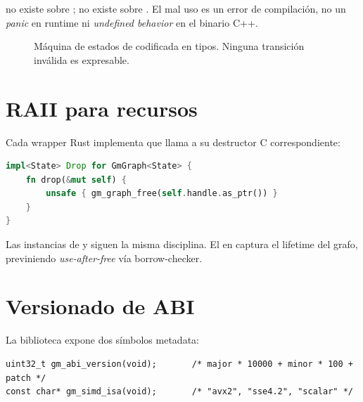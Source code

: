  no existe sobre ;
 no existe sobre . El mal uso
es un error de compilación, no un \emph{panic} en runtime ni
\emph{undefined behavior} en el binario C++.

\begin{figure}[H]
\centering
{}
\caption{Máquina de estados de  codificada en
tipos. Ninguna transición inválida es expresable.}
\label{fig:paper-typestate}
\end{figure}

\section{RAII para recursos}

Cada wrapper Rust implementa  que llama a su destructor
C correspondiente:

\begin{lstlisting}[language=Rust]
impl<State> Drop for GmGraph<State> {
    fn drop(&mut self) {
        unsafe { gm_graph_free(self.handle.as_ptr()) }
    }
}
\end{lstlisting}

Las instancias de  y  siguen la
misma disciplina. El  en  captura el
lifetime del grafo, previniendo \emph{use-after-free} vía
borrow-checker.

\section{Versionado de ABI}

La biblioteca expone dos símbolos metadata:

\begin{lstlisting}[basicstyle=\ttfamily\small]
uint32_t gm_abi_version(void);       /* major * 10000 + minor * 100 + patch */
const char* gm_simd_isa(void);       /* "avx2", "sse4.2", "scalar" */
\end{lstlisting}

